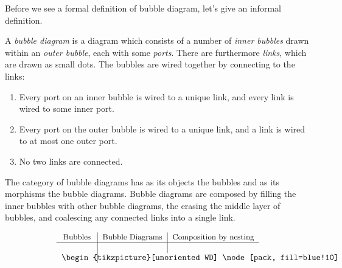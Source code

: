 \documentclass[DynamicalBook]{subfiles}
\begin{document}
Before we see a formal definition of bubble diagram, let's give an informal definition.
\begin{informal}
  A \emph{bubble diagram} is a diagram which consists of a number of \emph{inner
  bubbles} drawn within an \emph{outer bubble}, each with some \emph{ports}.
There are furthermore \emph{links}, which are drawn as small dots. The bubbles
are wired together by connecting to the links:
\begin{enumerate}
  \item Every port on an inner bubble is wired to a unique link, and every link
    is wired to some inner port.
\item Every port on the outer bubble is wired to a unique link, and a link is
  wired to at most one outer port.
  \item No two links are connected.
\end{enumerate}
The category of bubble diagrams has as its objects the bubbles and as its
morphisms the bubble diagrams. Bubble diagrams are composed by filling the inner
bubbles with other bubble diagrams, the erasing the middle layer of bubbles, and
coalescing any connected links into a single link.

\begin{equation}\label{eqn.bubble_diagram_example_misc}
\begin{tabular}{c|c|c}
\small Bubbles &\small Bubble Diagrams &\small Composition by nesting\\\hline
~&&\\
\parbox{.5in}{
\begin{tikzpicture}[unoriented WD]
  \node[pack, fill=blue!10] (X1) {$\phantom{S}$};
  \node[above right = of X1] (w11) {};
  \draw (X1) -- (w11);

  \node[pack, fill=blue!10, below=.4cm of X1] (X2) {$\phantom{S}$};
  \node[above right = of X2] (w21) {};
  \node[below left = of X2] (w22) {};
  \draw (X2) -- (w21);
  \draw (X2) -- (w22);


\end{tikzpicture}}
\end{tabular}
\end{equation}
\end{informal}
\end{document}
